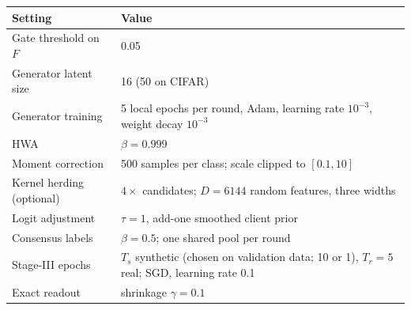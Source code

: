\documentclass[11pt]{article}
\theoremstyle{plain}
\theoremstyle{definition}
\begin{document}
\begin{center}
\small
\begin{tabularx}{\linewidth}{>{\raggedright\arraybackslash}p{4.6cm}X}
\toprule
Setting & Value\\
\midrule
Gate threshold on $F$ & 0.05\\
Generator latent size & 16 (50 on CIFAR)\\
Generator training & 5 local epochs per round, Adam, learning rate $10^{-3}$, weight decay $10^{-3}$\\
HWA & $\beta=0.999$\\
Moment correction & 500 samples per class; scale clipped to $[0.1,10]$\\
Kernel herding (optional) & $4\times$ candidates; $D=6144$ random features, three widths\\
Logit adjustment & $\tau=1$, add-one smoothed client prior\\
Consensus labels & $\beta=0.5$; one shared pool per round\\
Stage-III epochs & $T_s$ synthetic (chosen on validation data; 10 or 1), $T_r=5$ real; SGD, learning rate 0.1\\
Exact readout & shrinkage $\gamma=0.1$\\
\bottomrule
\end{tabularx}
\end{center}
\end{document}
